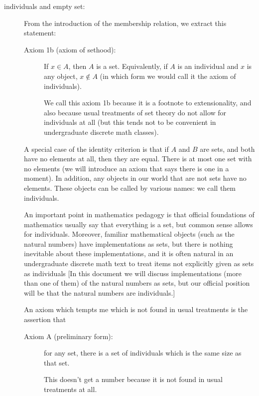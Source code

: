 \documentclass[12pt]{article}
\begin{document}
\begin{description}
\begin{description}
\end{description}

\item[individuals and empty set:]   From the introduction of the membership relation, we extract this statement:  

\begin{description}
\item[Axiom 1b (axiom of sethood):]  If $x \in A$, then $A$ is a set.  Equivalently, if $A$ is an individual and $x$ is any object, $x \not\in A$ (in which form we would call it the axiom of individuals).

We call this axiom 1b because it is a footnote to extensionality, and also because usual treatments of set theory do not allow for individuals at all (but this tends not to be convenient in undergraduate discrete math classes).
\end{description}

A special case of the identity criterion is that if $A$ and $B$ are sets, and both have no elements at all, then they are equal.   There is at most one set with no elements (we will introduce an axiom that says there is one in a moment).  In addition, any objects in our world that are not sets have no elements.  These objects can be called by various names:  we call them individuals.

An important point in mathematics pedagogy is that official foundations of mathematics usually say that everything is a set,  but common sense allows for individuals.  Moreover, familiar mathematical objects (such as the natural numbers) have implementations as sets, but there is nothing inevitable about these implementations, and it is often natural in an undergraduate discrete math text to treat items not explicitly given as sets as individuals [In this document we will discuss implementations (more than one of them) of the natural numbers as sets, but our official position will be that the natural numbers are individuals.]

An axiom which tempts me which is not found in usual treatments is the assertion that 

\begin{description}

\item[Axiom A (preliminary form):]  for any set, there is a set of individuals which is the same size as that set.  

This doesn't get a number because it is not found in usual treatments at all.


\end{description}
\end{description}
\end{document}
